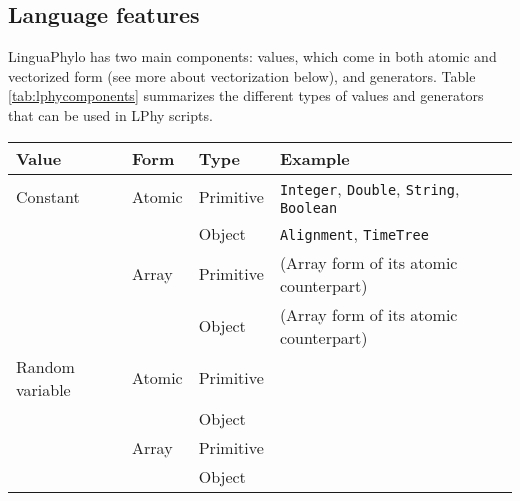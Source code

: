 \documentclass[10pt,letterpaper,table]{article}
\begin{document}

\subsection*{Language features}

LinguaPhylo has two main components: values, which come in both atomic
and vectorized form (see more about vectorization below), and
generators.
Table \ref{tab:lphycomponents} summarizes the different types of
values and generators that can be used in LPhy scripts.

\begin{table}[]
  \begin{tabular}{lllll}
    \hline
    Value & Form & Type & Example\\\hline
    Constant & Atomic & Primitive & \texttt{Integer}, \texttt{Double},
                                    \texttt{String}, \texttt{Boolean}\\
          & & Object & \texttt{Alignment}, \texttt{TimeTree}\\
          & Array & Primitive & (Array form of its atomic counterpart)\\
          & & Object & (Array form of its atomic counterpart)\\\hline
    Random variable & Atomic & Primitive\\
          & & Object\\
          & Array & Primitive\\
          & & Object\\ 
\end{tabular}
\end{table}
\end{document}
